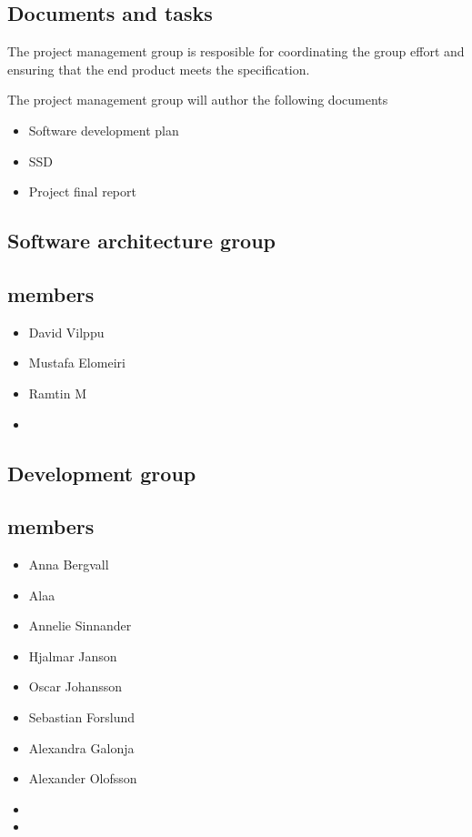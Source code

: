 \documentclass{article}
\begin{document}
        \subsection{Documents and tasks}
            The project management group is resposible for coordinating the group effort and ensuring that the end product meets the specification. 
            
            The project management group will author the following documents
            \begin{itemize}
                \item Software development plan
                \item SSD
                \item Project final report
            \end{itemize}
    
    \subsection{Software architecture group}
        \subsection{members}
            \begin{itemize}
                \item David Vilppu
                \item Mustafa Elomeiri
                \item Ramtin M
                \item 
            \end{itemize}
            
    \subsection{Development group}
        \subsection{members}
            \begin{itemize}
                \item Anna Bergvall
                \item Alaa
                \item Annelie Sinnander
                \item Hjalmar Janson
                \item Oscar Johansson
                \item Sebastian Forslund
                \item Alexandra Galonja
                \item Alexander Olofsson
                \item
                \item
            \end{itemize}
    
\end{document}
